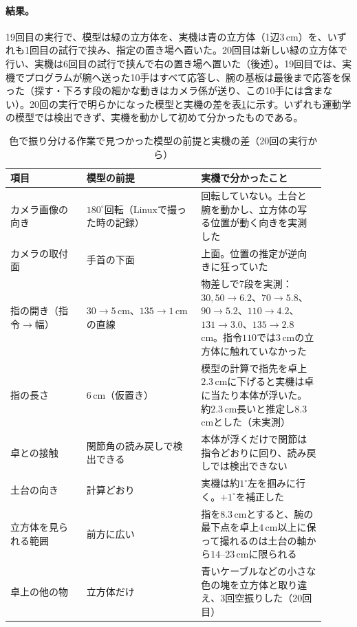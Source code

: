 \documentclass[10pt,letterpaper]{article}
\begin{document}
\paragraph{結果。}19回目の実行で、模型は緑の立方体を、実機は青の立方体（1辺$3$\,cm）を、いずれも1回目の試行で挟み、指定の置き場へ置いた。20回目は新しい緑の立方体で行い、実機は6回目の試行で挟んで右の置き場へ置いた（後述）。19回目では、実機でプログラムが腕へ送った10手はすべて応答し、腕の基板は最後まで応答を保った（探す・下ろす段の細かな動きはカメラ係が送り、この10手には含まない）。20回の実行で明らかになった模型と実機の差を表\ref{tab:sortgap}に示す。いずれも運動学の模型では検出できず、実機を動かして初めて分かったものである。

\begin{table}[h]
\centering\small
\caption{色で振り分ける作業で見つかった模型の前提と実機の差（20回の実行から）}
\label{tab:sortgap}
\begin{tabular}{p{0.22\linewidth}p{0.33\linewidth}p{0.36\linewidth}}
\toprule
項目 & 模型の前提 & 実機で分かったこと \\
\midrule
カメラ画像の向き & $180^{\circ}$回転（Linuxで撮った時の記録） & 回転していない。土台と腕を動かし、立方体の写る位置が動く向きを実測した \\
カメラの取付面 & 手首の下面 & 上面。位置の推定が逆向きに狂っていた \\
指の開き（指令$\to$幅） & $30\to5$\,cm、$135\to1$\,cmの直線 & 物差しで7段を実測：$30,50\to6.2$、$70\to5.8$、$90\to5.2$、$110\to4.2$、$131\to3.0$、$135\to2.8$\,cm。指令$110$では$3$\,cmの立方体に触れていなかった \\
指の長さ & $6$\,cm（仮置き） & 模型の計算で指先を卓上$2.3$\,cmに下げると実機は卓に当たり本体が浮いた。約$2.3$\,cm長いと推定し$8.3$\,cmとした（未実測） \\
卓との接触 & 関節角の読み戻しで検出できる & 本体が浮くだけで関節は指令どおりに回り、読み戻しでは検出できない \\
土台の向き & 計算どおり & 実機は約$1^{\circ}$左を掴みに行く。$+1^{\circ}$を補正した \\
立方体を見られる範囲 & 前方に広い & 指を$8.3$\,cmとすると、腕の最下点を卓上$4$\,cm以上に保って撮れるのは土台の軸から$14$--$23$\,cmに限られる \\
卓上の他の物 & 立方体だけ & 青いケーブルなどの小さな色の塊を立方体と取り違え、3回空振りした（20回目） \\
\bottomrule
\end{tabular}
\end{table}
\end{document}
